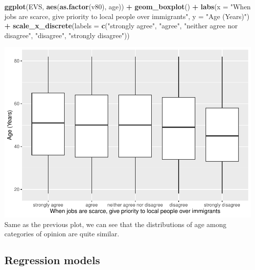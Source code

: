 \documentclass[
]{article}
\newenvironment{Shaded}{\begin{snugshade}}{\end{snugshade}}
\newcommand{\AttributeTok}[1]{\textcolor[rgb]{0.13,0.29,0.53}{#1}}
\newcommand{\FunctionTok}[1]{\textcolor[rgb]{0.13,0.29,0.53}{\textbf{#1}}}
\newcommand{\NormalTok}[1]{#1}
\newcommand{\SpecialCharTok}[1]{\textcolor[rgb]{0.81,0.36,0.00}{\textbf{#1}}}
\newcommand{\StringTok}[1]{\textcolor[rgb]{0.31,0.60,0.02}{#1}}
\begin{document}
\begin{Shaded}
\begin{Highlighting}[]
\FunctionTok{ggplot}\NormalTok{(EVS, }\FunctionTok{aes}\NormalTok{(}\FunctionTok{as.factor}\NormalTok{(v80), age)) }\SpecialCharTok{+} 
  \FunctionTok{geom\_boxplot}\NormalTok{() }\SpecialCharTok{+} 
  \FunctionTok{labs}\NormalTok{(}\AttributeTok{x =} \StringTok{"When jobs are scarce, give priority to local people over immigrants"}\NormalTok{, }
       \AttributeTok{y =} \StringTok{"Age (Years)"}\NormalTok{) }\SpecialCharTok{+} 
  \FunctionTok{scale\_x\_discrete}\NormalTok{(}\AttributeTok{labels =} \FunctionTok{c}\NormalTok{(}\StringTok{"strongly agree"}\NormalTok{, }\StringTok{"agree"}\NormalTok{, }\StringTok{"neither agree nor disagree"}\NormalTok{, }
                              \StringTok{"disagree"}\NormalTok{, }\StringTok{"strongly disagree"}\NormalTok{))}
\end{Highlighting}
\end{Shaded}

\includegraphics{Report-for-statisticians_files/figure-latex/plot_v80-1.pdf}
Same as the previous plot, we can see that the distributions of age
among categories of opinion are quite similar.

\hypertarget{regression-models}{%
\subsection{Regression models}\label{regression-models}}
\end{document}
